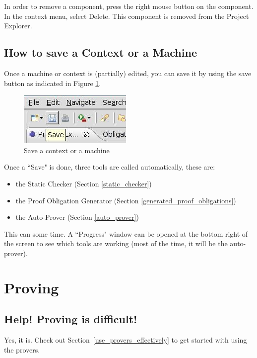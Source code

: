 In order to remove a component, press the right mouse button on the component. In the context menu, select \textsf{Delete}. This component is removed from the \textsf{Project Explorer}. 

\subsection{How to save a Context or a Machine}

Once a machine or context is (partially) edited, you can save it by using the save button as indicated in Figure \ref{fig_faq_saveaction}.

\begin{figure}[!ht]
\begin{center}
	\includegraphics{img/faq/faq_saveaction.png}
	\caption{Save a context or a machine}
	\label{fig_faq_saveaction}
\end{center}
\end{figure}

Once a ``Save" is done, three tools are called automatically, these are:

\begin{itemize}
	\item the Static Checker (Section \ref{static_checker})
	\item the Proof Obligation Generator (Section \ref{generated_proof_obligations})
	\item the Auto-Prover (Section \ref{auto_prover})
\end{itemize}

This can some time. A ``Progress" window can be opened at the bottom right of the screen to see which tools are working (most of the time, it will be the auto-prover). 

\section{Proving}

\subsection{Help!  Proving is difficult!}

Yes, it is.  Check out Section~\ref{use_provers_effectively} to get started with using the provers.

